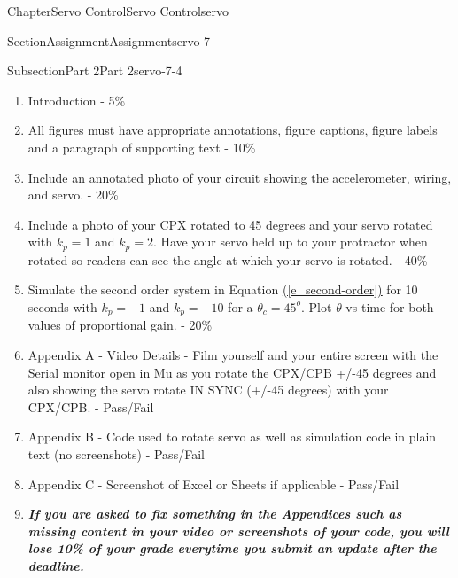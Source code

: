 \documentclass[oneside,10pt,]{book}
\newcommand{\xreffont}{\relax}
\newcommand{\linkhilite}[1]{\underline{#1}}
\newcommand{\alert}[1]{\textbf{\textit{#1}}}
\numberwithin{equation}{section}
\begin{document}
\begin{chapterptx}{Chapter}{Servo Control}{}{Servo Control}{}{}{servo}
\begin{sectionptx}{Section}{Assignment}{}{Assignment}{}{}{servo-7}
\begin{subsectionptx}{Subsection}{Part 2}{}{Part 2}{}{}{servo-7-4}
\begin{enumerate}
\item{}Introduction - 5\%%
\item{}All figures must have appropriate annotations, figure captions, figure labels and a paragraph of supporting text - 10\%%
\item{}Include an annotated photo of your circuit showing the accelerometer, wiring, and servo. - 20\%%
\item{}Include a photo of your CPX rotated to 45 degrees and your servo rotated with \(k_p=1\) and \(k_p=2\). Have your servo held up to your protractor when rotated so readers can see the angle at which your servo is rotated. - 40\%%
\item{}Simulate the second order system in Equation \hyperref[e_second-order]{\linkhilite{({\xreffont\ref{e_second-order}})}} for 10 seconds with \(k_p=-1\) and \(k_p=-10\) for a \(\theta_c=45^o\). Plot \(\theta\) vs time for both values of proportional gain. - 20\%%
\item{}Appendix A - Video Details - Film yourself and your entire screen with the Serial monitor open in Mu as you rotate the CPX\slash{}CPB +\slash{}-45 degrees and also showing the servo rotate IN SYNC (+\slash{}-45 degrees) with your CPX\slash{}CPB. - Pass\slash{}Fail%
\item{}Appendix B - Code used to rotate servo as well as simulation code in plain text (no screenshots) - Pass\slash{}Fail%
\item{}Appendix C - Screenshot of Excel or Sheets if applicable - Pass\slash{}Fail%
\item{}\alert{If you are asked to fix something in the Appendices such as missing content in your video or screenshots of your code, you will lose 10\% of your grade everytime you submit an update after the deadline.}%
\end{enumerate}
\end{subsectionptx}
\end{sectionptx}
\end{chapterptx}
%
%
\typeout{************************************************}
\typeout{************************************************}
%
\end{document}
